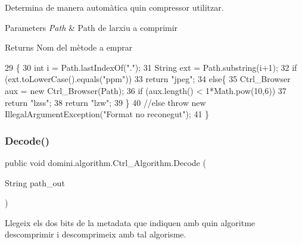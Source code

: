 Determina de manera automàtica quin compressor utilitzar. 


\begin{DoxyParams}{Parameters}
{\em Path} & Path de l\textquotesingle{}arxiu a comprimir \\
\hline
\end{DoxyParams}
\begin{DoxyReturn}{Returns}
Nom del mètode a emprar 
\end{DoxyReturn}

\begin{DoxyCode}
29     \{
30         \textcolor{keywordtype}{int} i = Path.lastIndexOf(\textcolor{stringliteral}{"."});
31         String ext = Path.substring(i+1);
32         \textcolor{keywordflow}{if} (ext.toLowerCase().equals(\textcolor{stringliteral}{"ppm"})) 
33             \textcolor{keywordflow}{return} \textcolor{stringliteral}{"jpeg"};
34         \textcolor{keywordflow}{else}\{  
35             Ctrl\_Browser aux = \textcolor{keyword}{new} Ctrl\_Browser(Path);
36             \textcolor{keywordflow}{if} (aux.length() < 1*Math.pow(10,6))
37                 \textcolor{keywordflow}{return} \textcolor{stringliteral}{"lzss"};
38             \textcolor{keywordflow}{return} \textcolor{stringliteral}{"lzw"};
39         \}
40             \textcolor{comment}{//else throw new IllegalArgumentException("Format no reconegut");}
41     \}
\end{DoxyCode}
\mbox{\label{classdomini_1_1algorithm_1_1Ctrl__Algorithm_a6c3c10937741891cfeae31043b64a975}} 
\subsubsection{\texorpdfstring{Decode()}{Decode()}}
{\footnotesize\ttfamily public void domini.\+algorithm.\+Ctrl\+\_\+\+Algorithm.\+Decode (\begin{DoxyParamCaption}\item[{String}]{path\+\_\+out }\end{DoxyParamCaption})\hspace{0.3cm}{\ttfamily [inline]}}



Llegeix els dos bits de la metadata que indiquen amb quin algoritme descomprimir i descomprimeix amb tal algorisme. 

